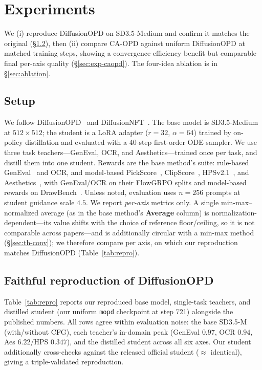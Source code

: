 \section{Experiments}
\label{sec:experiments}

We (i) reproduce DiffusionOPD on SD3.5-Medium and confirm it matches the original
(\S\ref{sec:exp-repro}), then (ii) compare CA-OPD against uniform DiffusionOPD at
matched training steps, showing a convergence-efficiency benefit but comparable
final per-axis quality (\S\ref{sec:exp-caopd}). The four-idea ablation is in
\S\ref{sec:ablation}.

\subsection{Setup}
\label{sec:exp-setup}

We follow DiffusionOPD~\cite{li2026diffusionopd} and DiffusionNFT~\cite{zheng2025diffusionnft}.
The base model is SD3.5-Medium~\cite{esser2024scaling} at $512{\times}512$; the
student is a LoRA adapter ($r{=}32$, $\alpha{=}64$) trained by on-policy
distillation and evaluated with a 40-step first-order ODE sampler. We use three
task teachers---GenEval, OCR, and Aesthetics---trained once per task, and distill
them into one student. Rewards are the base method's suite: rule-based GenEval~\cite{ghosh2023geneval}
and OCR, and model-based PickScore~\cite{kirstain2023pick}, ClipScore~\cite{hessel2021clipscore},
HPSv2.1~\cite{wu2023human}, and Aesthetics~\cite{schuhmann2022aesthetics}, with
GenEval/OCR on their FlowGRPO splits and model-based rewards on
DrawBench~\cite{saharia2022photorealistic}. Unless noted, evaluation uses
$n{=}256$ prompts at student guidance scale $4.5$. We report \emph{per-axis}
metrics only. A single min-max--normalized average (as in the base method's
\textbf{Average} column) is normalization-dependent---its value shifts with the
choice of reference floor/ceiling, so it is not comparable across papers---and is
additionally circular with a min-max method (\S\ref{sec:th-conv}); we therefore
compare per axis, on which our reproduction matches DiffusionOPD
(Table~\ref{tab:repro}).

\subsection{Faithful reproduction of DiffusionOPD}
\label{sec:exp-repro}

Table~\ref{tab:repro} reports our reproduced base model, single-task teachers, and
distilled student (our uniform \texttt{mopd} checkpoint at step 721) alongside the
published numbers. All rows agree within evaluation noise: the base SD3.5-M
(with/without CFG), each teacher's in-domain peak (GenEval $0.97$, OCR $0.94$, Aes
$6.22$/HPS $0.347$), and the distilled student across all six axes. Our student
additionally cross-checks against the released official student ($\approx$
identical), giving a triple-validated reproduction.

